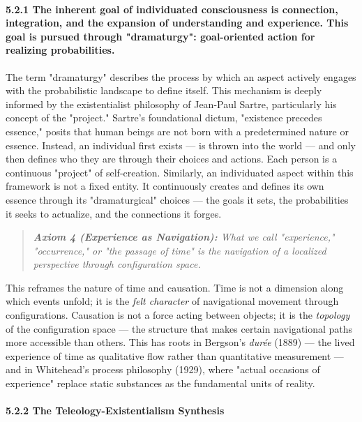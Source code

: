 \paragraph*{5.2.1 The inherent goal of individuated consciousness is connection, integration, and the expansion of understanding and experience. This goal is pursued through "dramaturgy": goal-oriented action for realizing probabilities.}


The term "dramaturgy" describes the process by which an aspect actively engages with the probabilistic landscape to define itself. This mechanism is deeply informed by the existentialist philosophy of Jean-Paul Sartre, particularly his concept of the "project." Sartre's foundational dictum, "existence precedes essence," posits that human beings are not born with a predetermined nature or essence. Instead, an individual first exists — is thrown into the world — and only then defines who they are through their choices and actions. Each person is a continuous "project" of self-creation. Similarly, an individuated aspect within this framework is not a fixed entity. It continuously creates and defines its own essence through its "dramaturgical" choices — the goals it sets, the probabilities it seeks to actualize, and the connections it forges.


\begin{quote}
\itshape
\textbf{Axiom 4 (Experience as Navigation):} \textit{What we call "experience," "occurrence," or "the passage of time" is the navigation of a localized perspective through configuration space.}
\end{quote}


This reframes the nature of time and causation. Time is not a dimension along which events unfold; it is the \textit{felt character} of navigational movement through configurations. Causation is not a force acting between objects; it is the \textit{topology} of the configuration space — the structure that makes certain navigational paths more accessible than others. This has roots in Bergson's \textit{durée} (1889) — the lived experience of time as qualitative flow rather than quantitative measurement — and in Whitehead's process philosophy (1929), where "actual occasions of experience" replace static substances as the fundamental units of reality.


\paragraph*{5.2.2 The Teleology-Existentialism Synthesis}


